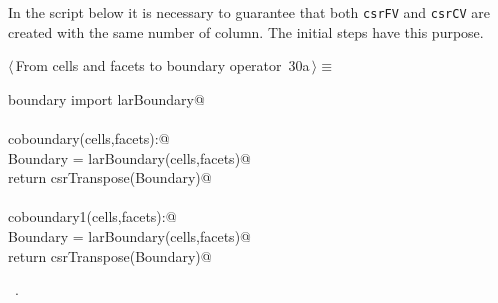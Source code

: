 \documentclass[11pt,oneside]{article}    %
\begin{document}
In the script below it is necessary to guarantee that both \texttt{csrFV} and \texttt{csrCV} are created with the same number of column. The initial steps have this purpose.

\begin{flushleft} \small \label{scrap49}
\protect{}$\langle\,$From cells and facets to boundary operator\nobreak\ {\footnotesize 30a}$\,\rangle\equiv$
\vspace{-1ex}
\begin{list}{}{} \item
\mbox{}\verb@from boundary import larBoundary@\\
\mbox{}\verb@@\\
\mbox{}\verb@def coboundary(cells,facets):@\\
\mbox{}\verb@    Boundary = larBoundary(cells,facets)@\\
\mbox{}\verb@    return csrTranspose(Boundary)@\\
\mbox{}\verb@@\\
\mbox{}\verb@def coboundary1(cells,facets):@\\
\mbox{}\verb@    Boundary = larBoundary(cells,facets)@\\
\mbox{}\verb@    return csrTranspose(Boundary)@\\
\mbox{}\verb@@{\NWsep}
\end{list}
\vspace{-1ex}
\footnotesize\addtolength{\baselineskip}{-1ex}
\begin{list}{}{\setlength{\itemsep}{-\parsep}\setlength{\itemindent}{-\leftmargin}}
\item \NWtxtMacroRefIn\ .
\end{list}
\end{flushleft}
\end{document}
